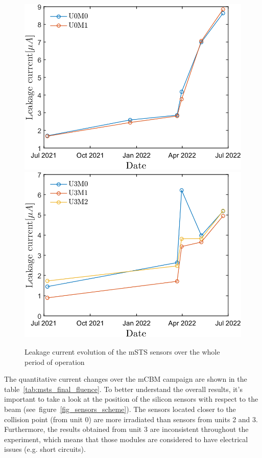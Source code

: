\begin{figure}[!h]
\centering
\includegraphics[width=0.45\columnwidth]{Chapter5/DCS/images/sensors/U0_leakage.png}
\includegraphics[width=0.45\columnwidth]{Chapter5/DCS/images/sensors/U3_leakage.png}
\caption{Leakage current evolution of the \gls{mSTS} sensors over the whole period of operation}
\label{fig_leak}
\end{figure}

\newpage
The quantitative current changes over the \gls{mCBM} campaign are shown in the table~\ref{tab:msts_final_fluence}. To better understand the overall results, it's important to take a look at the position of the silicon sensors with respect to the beam (see~figure~\ref{fig_sensors_scheme}). The sensors located closer to the collision point (from unit 0) are more irradiated than sensors from units 2 and 3. Furthermore, the results obtained from unit 3 are inconsistent throughout the experiment, which means that those modules are considered to have electrical issues (e.g. short circuits).


